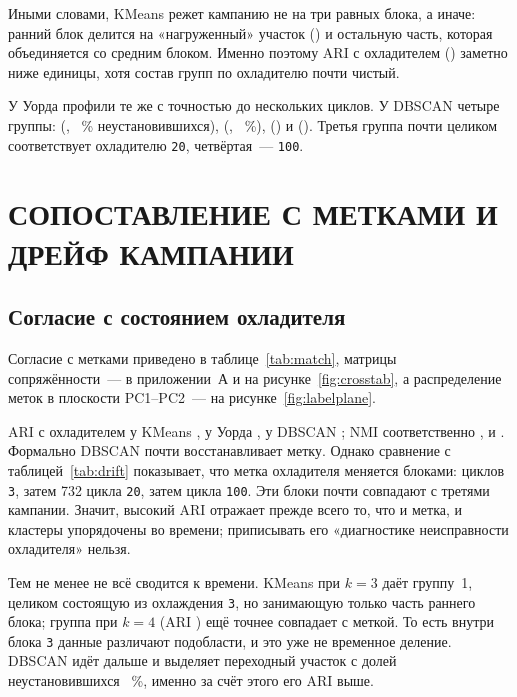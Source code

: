 \documentclass[14pt,a4paper]{extarticle}
\begin{document}
Иными словами, KMeans режет кампанию не на три равных блока, а иначе:
ранний блок делится на «нагруженный» участок (\KmSizeOne) и остальную часть,
которая объединяется со средним блоком. Именно поэтому ARI с охладителем
(\KmAriCooler) заметно ниже единицы, хотя состав групп по охладителю почти
чистый.

У Уорда профили те же с точностью до нескольких циклов. У DBSCAN четыре
группы: \DbSizeOne{} (\DbCycleOne, \DbStableOne~\% неустановившихся),
\DbSizeTwo{} (\DbCycleTwo, \DbStableTwo~\%), \DbSizeThree{} (\DbCycleThree)
и \DbSizeFour{} (\DbCycleFour). Третья группа почти целиком соответствует
охладителю \texttt{20}, четвёртая~--- \texttt{100}.

\section{СОПОСТАВЛЕНИЕ С МЕТКАМИ И ДРЕЙФ КАМПАНИИ}

\subsection{Согласие с состоянием охладителя}

Согласие с метками приведено в таблице~\ref{tab:match}, матрицы
сопряжённости~--- в приложении~А и на рисунке~\ref{fig:crosstab}, а
распределение меток в плоскости PC1--PC2~--- на рисунке~\ref{fig:labelplane}.

ARI с охладителем у KMeans \KmAriCooler, у Уорда \WardAriCooler, у DBSCAN
\DbAriCooler; NMI соответственно \KmNmiCooler, \WardNmiCooler{} и
\DbNmiCooler. Формально DBSCAN почти восстанавливает метку. Однако сравнение
с таблицей~\ref{tab:drift} показывает, что метка охладителя меняется блоками:
\CoolerPerLevel{} циклов \texttt{3}, затем 732 цикла \texttt{20}, затем
\CoolerLast{} цикла \texttt{100}. Эти блоки почти совпадают с третями
кампании. Значит, высокий ARI отражает прежде всего то, что и метка, и
кластеры упорядочены во времени; приписывать его «диагностике неисправности
охладителя» нельзя.

Тем не менее не всё сводится к времени. KMeans при $k=3$ даёт группу~1,
целиком состоящую из охлаждения \texttt{3}, но занимающую только часть
раннего блока; группа при $k=4$ (ARI \KFourAriCooler) ещё точнее совпадает
с меткой. То есть внутри блока \texttt{3} данные различают подобласти, и это
уже не временное деление. DBSCAN идёт дальше и выделяет переходный участок с
долей неустановившихся \DbStableOne~\%, именно за счёт этого его ARI выше.
\end{document}
